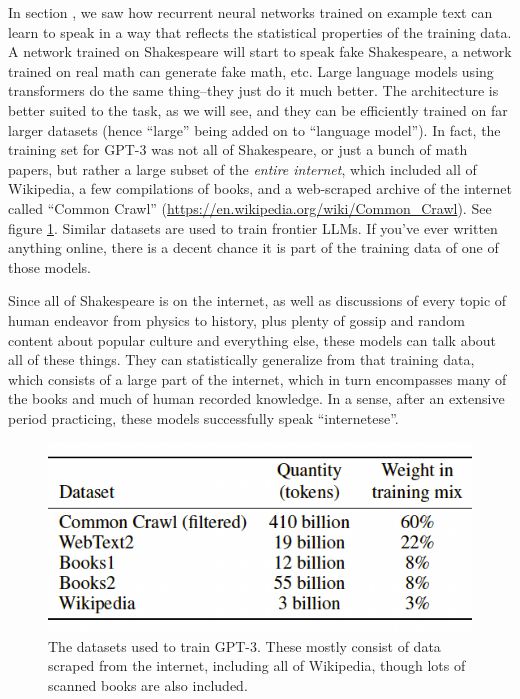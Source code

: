 In section , we saw how recurrent neural
networks trained on example text can learn to speak in a way that reflects the
statistical properties of the training data. A network trained on Shakespeare
will start to speak fake Shakespeare, a network trained on real math can
generate fake math, etc. Large language models using transformers do the same
thing--they just do it much better. The architecture is better suited to the
task, as we will see, and they can be efficiently trained on far larger
datasets (hence ``large'' being added on to ``language model''). In fact, the
training set for GPT-3 was not all of Shakespeare, or just a bunch of math
papers, but rather a large subset of the \emph{entire internet}, which included
all of Wikipedia, a few compilations of books, and a web-scraped archive of the
internet called ``Common Crawl''
(\url{https://en.wikipedia.org/wiki/Common_Crawl}). See figure
\ref{gptDatasets}. Similar datasets are used to train frontier LLMs. If you've
ever written anything online, there is a decent chance it is part of the
training data of one of those models.

Since all of Shakespeare is on the internet, as well as discussions of every
topic of human endeavor from physics to history, plus plenty of gossip and
random content about popular culture and everything else, these models can talk
about all of these things. They can statistically generalize from that training
data, which consists of a large part of the internet, which in turn encompasses
many of the books and much of human recorded knowledge. In a sense, after an
extensive period practicing, these models successfully speak ``internetese''.

\begin{figure}[ht]
\centering
\includegraphics[scale=.4]{./images/gptDatasets}
\caption[From \cite{brown2020language}.]{The datasets used to train GPT-3.
These mostly consist of data scraped from the internet, including all of
Wikipedia, though lots of scanned books are also included.}
\label{gptDatasets}
\end{figure}

